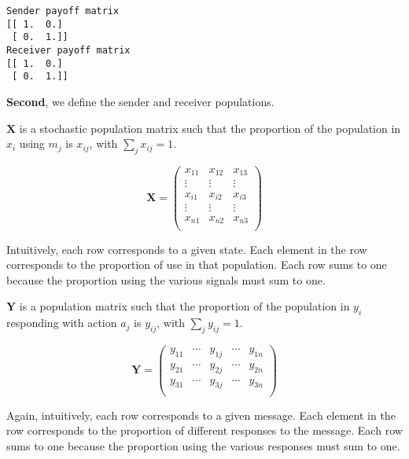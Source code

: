 \documentclass{article}
\begin{document}
    \begin{Verbatim}[commandchars=\\\{\}]
Sender payoff matrix
[[ 1.  0.]
 [ 0.  1.]]
Receiver payoff matrix
[[ 1.  0.]
 [ 0.  1.]]
    \end{Verbatim}

    \textbf{Second}, we define the sender and receiver populations.

$\textbf{X}$ is a stochastic population matrix such that the proportion
of the population in $x_i$ using $m_j$ is $x_{ij}$, with
$\sum_j x_{ij} = 1$.

\begin{equation}
\textbf{X} =
 \begin{pmatrix}
  x_{11} &  x_{12} & x_{13} \\
  \vdots        & \vdots & \vdots \\
  x_{i1} &  x_{i2} & x_{i3} \\
  \vdots    & \vdots    & \vdots \\
  x_{n1} &  x_{n2} & x_{n3} \\
 \end{pmatrix}
\end{equation}

Intuitively, each row corresponds to a given state. Each element in the
row corresponds to the proportion of use in that population. Each row
sums to one because the proportion using the various signals must sum to
one.

$\textbf{Y}$ is a population matrix such that the proportion of the
population in $y_i$ responding with action $a_j$ is $y_{ij}$, with
$\sum_j y_{ij} = 1$.

\begin{equation}
\textbf{Y} =
 \begin{pmatrix}
  y_{11} & \cdots & y_{1j}  & \cdots & y_{1n} \\
  y_{21} & \cdots & y_{2j}  & \cdots & y_{2n} \\
  y_{31} & \cdots & y_{3j}  & \cdots & y_{3n} \\
 \end{pmatrix}
\end{equation}

Again, intuitively, each row corresponds to a given message. Each
element in the row corresponds to the proportion of different responses
to the message. Each row sums to one because the proportion using the
various responses must sum to one.
\end{document}
